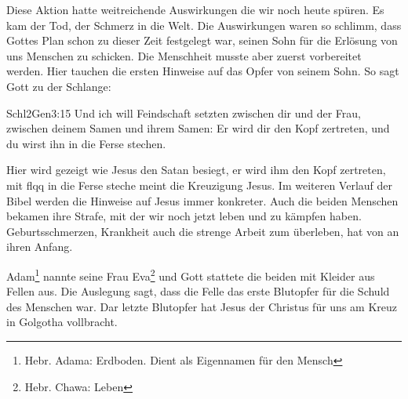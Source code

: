 Diese Aktion hatte weitreichende Auswirkungen die wir noch heute spüren. Es kam der Tod, der Schmerz in die Welt. Die Auswirkungen waren so schlimm, dass Gottes Plan schon zu dieser Zeit festgelegt war, seinen Sohn für die Erlösung von uns Menschen zu schicken. Die Menschheit musste aber zuerst vorbereitet werden. Hier tauchen die ersten Hinweise auf das Opfer von seinem Sohn. So sagt Gott zu der Schlange:
\begin{bibeltext}{Schl2}{Gen}{3:15}
	Und ich will Feindschaft setzten zwischen dir und der Frau, zwischen deinem Samen und ihrem Samen: Er wird dir den Kopf zertreten, und du wirst ihn in die Ferse stechen.
\end{bibeltext}
Hier wird gezeigt wie Jesus den Satan besiegt, \flqq er wird ihm den Kopf zertreten, mit flqq in die Ferse steche \frqq{} meint die Kreuzigung Jesus. Im weiteren Verlauf der Bibel werden die Hinweise auf Jesus immer konkreter.
Auch die beiden Menschen bekamen ihre Strafe, mit der wir noch jetzt leben und zu kämpfen haben. Geburtsschmerzen, Krankheit auch die strenge Arbeit zum überleben, hat von an ihren Anfang.

Adam\footnote{Hebr. Adama: Erdboden. Dient als Eigennamen für den Mensch} nannte seine Frau Eva\footnote{Hebr. Chawa: Leben} und Gott stattete die beiden mit Kleider aus Fellen aus. Die Auslegung sagt, dass die Felle das erste Blutopfer für die Schuld des Menschen war. Dar letzte Blutopfer hat Jesus der Christus für uns am Kreuz in Golgotha vollbracht.